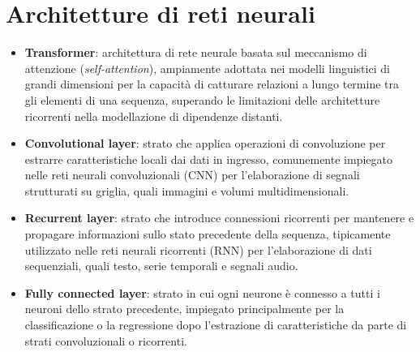 \section{Architetture di reti neurali}
\begin{itemize}
	\item \textbf{Transformer}: architettura di rete neurale basata sul meccanismo di attenzione (\emph{self-attention}), ampiamente adottata nei modelli linguistici di grandi dimensioni per la capacità di catturare relazioni a lungo termine tra gli elementi di una sequenza, superando le limitazioni delle architetture ricorrenti nella modellazione di dipendenze distanti.
	\item \textbf{Convolutional layer}: strato che applica operazioni di convoluzione per estrarre caratteristiche locali dai dati in ingresso, comunemente impiegato nelle reti neurali convoluzionali (CNN) per l'elaborazione di segnali strutturati su griglia, quali immagini e volumi multidimensionali.
	\item \textbf{Recurrent layer}: strato che introduce connessioni ricorrenti per mantenere e propagare informazioni sullo stato precedente della sequenza, tipicamente utilizzato nelle reti neurali ricorrenti (RNN) per l'elaborazione di dati sequenziali, quali testo, serie temporali e segnali audio.
	\item \textbf{Fully connected layer}: strato in cui ogni neurone è connesso a tutti i neuroni dello strato precedente, impiegato principalmente per la classificazione o la regressione dopo l'estrazione di caratteristiche da parte di strati convoluzionali o ricorrenti.
\end{itemize}

